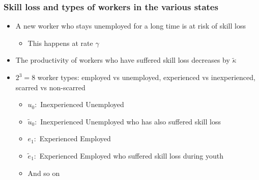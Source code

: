 \documentclass[9pt,xcolor={svgnames}]{beamer}
\begin{document}
\begin{frame}

\frametitle{Skill loss and types of workers in the various states}

\begin{itemize}

\setlength\itemsep{1.8em}

\item A new worker who stays unemployed for a long time is at risk of skill loss
\begin{itemize}
\smallskip
\item This happens at rate $\gamma$
\end{itemize}

\item The productivity of workers who have suffered skill loss decreases by $\tilde{\kappa}$

\item $2^{3} = 8$ worker types: employed vs unemployed, experienced vs inexperienced, scarred vs non-scarred
\smallskip
\begin{itemize}
\item $u_0:$ Inexperienced Unemployed
\smallskip
\item $\tilde{u}_0:$ Inexperienced Unemployed who has also suffered skill loss
\smallskip
\item ${e}_1:$ Experienced Employed
\smallskip
\item $\tilde{e}_1:$ Experienced Employed who suffered skill loss during youth
\smallskip 
\item And so on
\end{itemize}





\end{itemize}
\end{frame}
\end{document}
